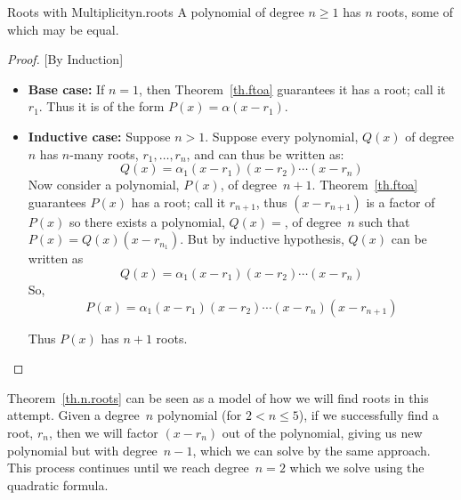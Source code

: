 \begin{theorem}{Roots with Multiplicity}{n.roots}
  A polynomial of degree $n\ge 1$ has $n$ roots, some of which may be
  equal.
\end{theorem}
\begin{proof}

  [By Induction]
  
  \begin{itemize}
    
  \item \textbf{Base case:} If $n=1$, then Theorem~\ref{th.ftoa}
    guarantees it has a root; call it $r_1$.  Thus it is of the form
    $P(x)=\alpha (x-r_1)$.
  \item \textbf{Inductive case:} Suppose $n>1$.  Suppose every
    polynomial, $Q(x)$ of degree $n$ has $n$-many roots,
    $r_1,\ldots,r_n$, and can thus be written as:
    \[Q(x) = \alpha_1 (x - r_1) (x - r_2) \cdots (x - r_n)\]
    Now consider a polynomial, $P(x)$, of
    degree~$n+1$.  Theorem~\ref{th.ftoa} guarantees $P(x)$ has a root;
    call it $r_{n+1}$, thus $(x-r_{n+1})$ is a factor of $P(x)$ so there
    exists a polynomial, $Q(x)=$, of degree~$n$ such that
    $P(x) =  Q(x) (x-r_{n_1})$.
    But by inductive hypothesis, $Q(x)$ can be written
    as \[Q(x) = \alpha_1 (x - r_1) (x - r_2) \cdots (x - r_n)\]
    So, \[P(x) = \alpha_1 (x - r_1) (x - r_2) \cdots (x - r_n) (x-r_{n+1})\]

    Thus $P(x)$ has $n+1$ roots.
  \end{itemize}
\end{proof}

Theorem~\ref{th.n.roots} can be seen as a model of how we will find
roots in this attempt.  Given a degree~$n$ polynomial (for $2<n\leq
5$), if we successfully find a root, $r_n$, then we will factor
$(x-r_n)$ out of the polynomial, giving us new polynomial but with
degree~$n-1$, which we can solve by the same approach.  This process
continues until we reach degree~$n=2$ which we solve using the
quadratic formula.

